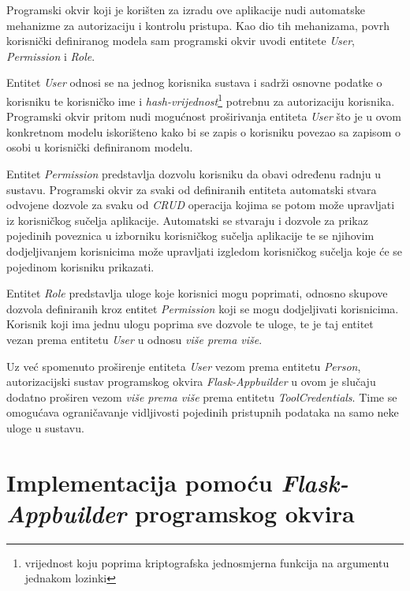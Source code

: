 \documentclass[times, utf8, diplomski]{fer}
\begin{document}
Programski okvir koji je korišten za izradu ove aplikacije nudi automatske
mehanizme za autorizaciju i kontrolu pristupa. Kao dio tih mehanizama, povrh
korisnički definiranog modela sam programski okvir uvodi entitete \emph{User},
\emph{Permission} i \emph{Role}.

Entitet \emph{User} odnosi se na jednog korisnika sustava i sadrži osnovne
podatke o korisniku te korisničko ime i
\emph{hash-vrijednost}\footnote{vrijednost koju poprima kriptografska
    jednosmjerna funkcija na argumentu jednakom lozinki} potrebnu za
autorizaciju korisnika.
Programski okvir pritom nudi mogućnost proširivanja entiteta \emph{User} što je u ovom
konkretnom modelu iskorišteno kako bi se zapis o korisniku povezao sa zapisom o
osobi u korisnički definiranom modelu.

Entitet \emph{Permission} predstavlja dozvolu korisniku da obavi određenu radnju
u sustavu. Programski okvir za svaki od definiranih entiteta automatski stvara
odvojene dozvole za svaku od \emph{CRUD} operacija kojima se potom može
upravljati iz korisničkog sučelja aplikacije. Automatski se stvaraju i dozvole
za prikaz pojedinih poveznica u izborniku korisničkog sučelja aplikacije te se
njihovim dodjeljivanjem korisnicima može upravljati izgledom korisničkog sučelja
koje će se pojedinom korisniku prikazati.

Entitet \emph{Role} predstavlja uloge koje korisnici mogu poprimati, odnosno
skupove dozvola definiranih kroz entitet \emph{Permission} koji se mogu
dodjeljivati korisnicima. Korisnik koji ima jednu ulogu poprima sve dozvole te
uloge, te je taj entitet vezan prema entitetu \emph{User} u odnosu \emph{više
prema više}.

Uz već spomenuto proširenje entiteta \emph{User} vezom prema entitetu
\emph{Person}, autorizacijski sustav programskog okvira \emph{Flask-Appbuilder}
u ovom je slučaju dodatno proširen vezom \emph{više prema više} prema entitetu
\emph{ToolCredentials}. Time se omogućava ograničavanje vidljivosti pojedinih
pristupnih podataka na samo neke uloge u sustavu.

\section{Implementacija pomoću \emph{Flask-Appbuilder} programskog okvira}
\end{document}
